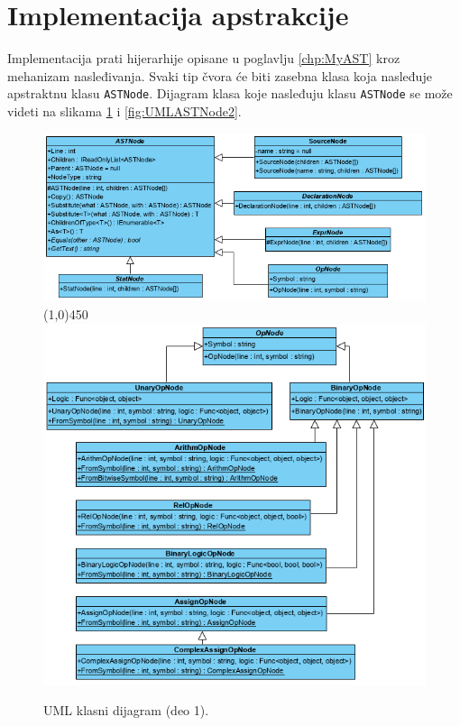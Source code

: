 \section{Implementacija apstrakcije}
\label{sec:ImplementationMyAST}

Implementacija prati hijerarhije opisane u poglavlju \ref{chp:MyAST} kroz mehanizam nasleđivanja. Svaki tip čvora će biti zasebna klasa koja nasleđuje apstraktnu klasu \texttt{ASTNode}. Dijagram klasa koje nasleđuju klasu \texttt{ASTNode} se može videti na slikama \ref{fig:UMLASTNode1} i \ref{fig:UMLASTNode2}. 

\begin{figure}[h!]
\centering
\includegraphics[scale=0.7]{images/uml/ASTNode.png}
\line(1,0){450}\\
\includegraphics[scale=0.7]{images/uml/OperatorNode.png}
\caption{UML klasni dijagram (deo 1).}
\label{fig:UMLASTNode1}
\end{figure}

